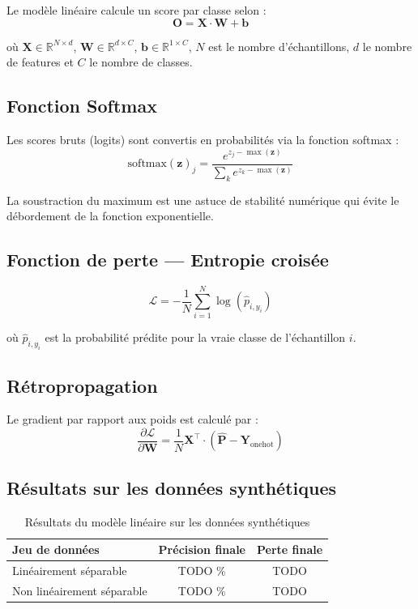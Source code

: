 \documentclass[12pt, a4paper]{report}
\begin{document}
Le modèle linéaire calcule un score par classe selon :
\[
    \mathbf{O} = \mathbf{X} \cdot \mathbf{W} + \mathbf{b}
\]

où $\mathbf{X} \in \mathbb{R}^{N \times d}$, $\mathbf{W} \in \mathbb{R}^{d \times C}$,
$\mathbf{b} \in \mathbb{R}^{1 \times C}$, $N$ est le nombre d'échantillons,
$d$ le nombre de features et $C$ le nombre de classes.

\subsection{Fonction Softmax}

Les scores bruts (logits) sont convertis en probabilités via la fonction softmax :
\[
    \text{softmax}(\mathbf{z})_j = \frac{e^{z_j - \max(\mathbf{z})}}{\sum_{k} e^{z_k - \max(\mathbf{z})}}
\]

La soustraction du maximum est une astuce de stabilité numérique qui
évite le débordement de la fonction exponentielle.

\subsection{Fonction de perte — Entropie croisée}

\[
    \mathcal{L} = -\frac{1}{N} \sum_{i=1}^{N} \log\left(\hat{p}_{i, y_i}\right)
\]

où $\hat{p}_{i, y_i}$ est la probabilité prédite pour la vraie classe
de l'échantillon $i$.

\subsection{Rétropropagation}

Le gradient par rapport aux poids est calculé par :
\[
    \frac{\partial \mathcal{L}}{\partial \mathbf{W}} =
    \frac{1}{N} \mathbf{X}^{\top} \cdot (\hat{\mathbf{P}} - \mathbf{Y}_{\text{onehot}})
\]

\subsection{Résultats sur les données synthétiques}


\begin{table}[H]
\centering
\begin{tabular}{lcc}
\toprule
\textbf{Jeu de données} & \textbf{Précision finale} & \textbf{Perte finale} \\
\midrule
Linéairement séparable & TODO \% & TODO \\
Non linéairement séparable & TODO \% & TODO \\
\bottomrule
\end{tabular}
\caption{Résultats du modèle linéaire sur les données synthétiques}
\end{table}
\end{document}
